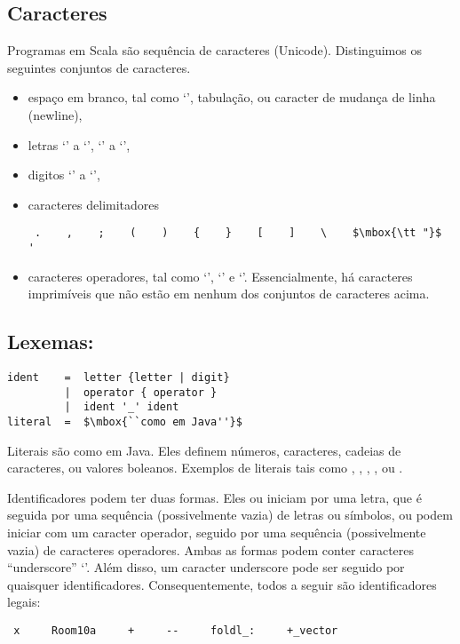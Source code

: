 \subsection*{Caracteres}
Programas em Scala s\~{a}o sequ\^{e}ncia de caracteres (Unicode). Distinguimos os
seguintes conjuntos de caracteres.
 \begin{itemize}
 \item
espa\c{c}o em branco, tal como `\code{ }', tabula\c{c}\~{a}o, ou caracter de mudan\c{c}a de linha (newline), 
 \item
letras `' a `', `' a `',    
 \item
digitos `' a `',   
 \item
caracteres delimitadores
 \begin{lstlisting}
 .    ,    ;    (    )    {    }    [    ]    \    $\mbox{\tt "}$    '
 \end{lstlisting}
 \item
caracteres operadores, tal como `\code{#}', `\code{+}' e `\code{:}'.
Essencialmente, h\'{a} caracteres imprim\'{i}veis que n\~{a}o est\~{a}o em nenhum dos 
conjuntos de caracteres acima.   
 \end{itemize}

\subsection*{Lexemas:}

\begin{lstlisting}
ident    =  letter {letter | digit}
         |  operator { operator }
         |  ident '_' ident
literal  =  $\mbox{``como em Java''}$
\end{lstlisting}

Literais s\~{a}o como em Java. Eles definem n\'{u}meros, caracteres, cadeias de caracteres, ou 
valores boleanos. Exemplos de literais tais como , , ,
, ou .

Identificadores podem ter duas formas. Eles ou iniciam por uma letra, que \'{e} 
seguida por uma sequ\^{e}ncia (possivelmente vazia) de letras ou s\'{i}mbolos, ou podem 
iniciar com um caracter operador, seguido por uma sequ\^{e}ncia (possivelmente vazia) de
caracteres operadores. Ambas as formas podem conter caracteres ``underscore'' `\code{_}'.
Al\'{e}m disso, um caracter underscore pode ser seguido por quaisquer identificadores.
Consequentemente, todos a seguir s\~{a}o identificadores legais:  
 \begin{lstlisting}
 x     Room10a     +     --     foldl_:     +_vector
 \end{lstlisting}

